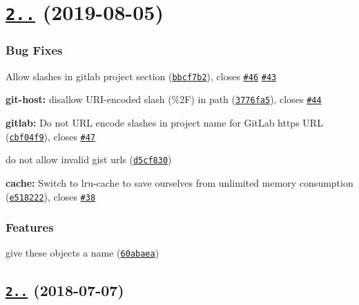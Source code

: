\label{_2.8.0}%
 \section*{\href{https://github.com/npm/hosted-git-info/compare/v2.7.1...v2.8.0}{\tt 2..} (2019-\/08-\/05)}

\subsubsection*{Bug Fixes}


\begin{DoxyItemize}
\item Allow slashes in gitlab project section (\href{https://github.com/npm/hosted-git-info/commit/bbcf7b2}{\tt bbcf7b2}), closes \href{https://github.com/npm/hosted-git-info/issues/46}{\tt \#46} \href{https://github.com/npm/hosted-git-info/issues/43}{\tt \#43}
\item {\bfseries git-\/host\+:} disallow U\+R\+I-\/encoded slash (\%2F) in {\ttfamily path} (\href{https://github.com/npm/hosted-git-info/commit/3776fa5}{\tt 3776fa5}), closes \href{https://github.com/npm/hosted-git-info/issues/44}{\tt \#44}
\item {\bfseries gitlab\+:} Do not U\+RL encode slashes in project name for Git\+Lab https U\+RL (\href{https://github.com/npm/hosted-git-info/commit/cbf04f9}{\tt cbf04f9}), closes \href{https://github.com/npm/hosted-git-info/issues/47}{\tt \#47}
\item do not allow invalid gist urls (\href{https://github.com/npm/hosted-git-info/commit/d5cf830}{\tt d5cf830})
\item {\bfseries cache\+:} Switch to lru-\/cache to save ourselves from unlimited memory consumption (\href{https://github.com/npm/hosted-git-info/commit/e518222}{\tt e518222}), closes \href{https://github.com/npm/hosted-git-info/issues/38}{\tt \#38}
\end{DoxyItemize}

\subsubsection*{Features}


\begin{DoxyItemize}
\item give these objects a name (\href{https://github.com/npm/hosted-git-info/commit/60abaea}{\tt 60abaea})
\end{DoxyItemize}

\label{_2.7.1}%
 \subsection*{\href{https://github.com/npm/hosted-git-info/compare/v2.7.0...v2.7.1}{\tt 2..} (2018-\/07-\/07)}

